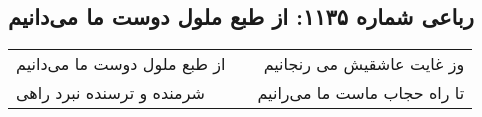 \begin{center}
\section*{رباعی شماره ۱۱۳۵: از طبع ملول دوست ما می‌دانیم}
\label{sec:1135}
\begin{longtable}{l p{0.5cm} r}
از طبع ملول دوست ما می‌دانیم
&&
وز غایت عاشقیش می رنجانیم
\\
شرمنده و ترسنده نبرد راهی
&&
تا راه حجاب ماست ما می‌رانیم
\\
\end{longtable}
\end{center}
